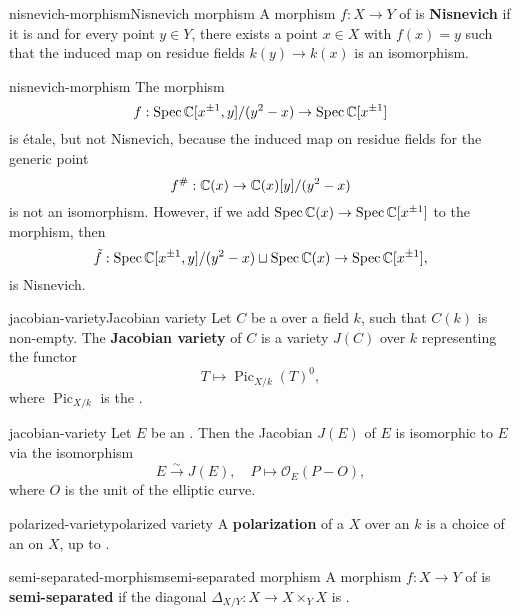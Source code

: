 \begin{topic}{nisnevich-morphism}{Nisnevich morphism}
    A morphism $f : X \to Y$ of  is \textbf{Nisnevich} if it is  and for every point $y \in Y$, there exists a point $x \in X$ with $f(x) = y$ such that the induced map on residue fields $k(y) \to k(x)$ is an isomorphism.
\end{topic}

\begin{example}{nisnevich-morphism}
    The morphism
    \[ f : \operatorname{Spec} \mathbb{C}[x^{\pm 1}, y] / (y^2 - x) \to \operatorname{Spec} \mathbb{C}[x^{\pm 1}] \]
    is étale, but not Nisnevich, because the induced map on residue fields for the generic point
    \[ f^\# : \mathbb{C}(x) \to \mathbb{C}(x)[y] / (y^2 - x) \]
    is not an isomorphism. However, if we add $\operatorname{Spec} \mathbb{C}(x) \to \operatorname{Spec} \mathbb{C}[x^{\pm 1}]$ to the morphism, then
    \[ \tilde{f} : \operatorname{Spec} \mathbb{C}[x^{\pm 1}, y] / (y^2 - x) \sqcup \operatorname{Spec} \mathbb{C}(x) \to \operatorname{Spec} \mathbb{C}[x^{\pm 1}] , \]
    is Nisnevich.
\end{example}

\begin{topic}{jacobian-variety}{Jacobian variety}
    Let $C$ be a    over a field $k$, such that $C(k)$ is non-empty.
    The \textbf{Jacobian variety} of $C$ is a variety $J(C)$ over $k$ representing the functor
    \[ T \mapsto \operatorname{Pic}_{X/k}(T)^0 , \]
    where $\operatorname{Pic}_{X/k}$ is the .
\end{topic}

\begin{example}{jacobian-variety}
    Let $E$ be an . Then the Jacobian $J(E)$ of $E$ is isomorphic to $E$ via the isomorphism
    \[ E \xrightarrow{\sim} J(E), \quad P \mapsto \mathcal{O}_E(P - O) , \]
    where $O$ is the unit of the elliptic curve.
\end{example}

\begin{topic}{polarized-variety}{polarized variety}
    A \textbf{polarization} of a  $X$ over an  $k$ is a choice of an  on $X$, up to .
\end{topic}

\begin{topic}{semi-separated-morphism}{semi-separated morphism}
    A morphism $f : X \to Y$ of  is \textbf{semi-separated} if the diagonal $\Delta_{X/Y} : X \to X \times_Y X$ is .
\end{topic}

